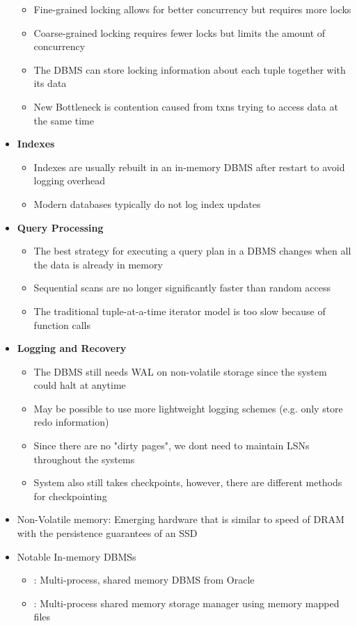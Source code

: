 \documentclass[11pt]{article}
\begin{document}
\begin{itemize}
\begin{itemize}
        \item Fine-grained locking allows for better concurrency but requires more locks
        \item Coarse-grained locking requires fewer locks but limits the amount of concurrency
        \item The DBMS can store locking information about each tuple together with its data
        \item New Bottleneck is contention caused from txns trying to access data at the same time
    \end{itemize}
    \item \textbf{Indexes}
    \begin{itemize}
        \item Indexes are usually rebuilt in an in-memory DBMS after restart to avoid logging overhead
        \item Modern databases typically do not log index updates
    \end{itemize}
    \item \textbf{Query Processing}
    \begin{itemize}
        \item The best strategy for executing a query plan in a DBMS changes when all the data is already in memory
        \item Sequential scans are no longer significantly faster than random access
        \item The traditional tuple-at-a-time iterator model is too slow because of function calls
    \end{itemize}
    \item \textbf{Logging and Recovery}
    \begin{itemize}
        \item The DBMS still needs WAL on non-volatile storage since the system could halt at anytime
        \item May be possible to use more lightweight logging schemes (e.g. only store redo information)
        \item Since there are no "dirty pages", we dont need to maintain LSNs throughout the systems
        \item System also still takes checkpoints, however, there are different methods for checkpointing
    \end{itemize}
    \item Non-Volatile memory: Emerging hardware that is similar to speed of DRAM with the persistence guarantees of an SSD
    \item Notable In-memory DBMSs
    \begin{itemize}
        \item {}: Multi-process, shared memory DBMS from Oracle~\cite{TimesTen}
        \item {}: Multi-process shared memory storage manager using memory mapped files~\cite{Dali}
    \end{itemize}
\end{itemize}

\newpage


\end{document}
